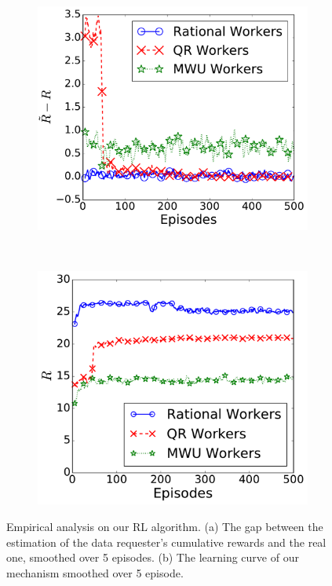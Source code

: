 \begin{figure}[!t]
   \setlength{\abovecaptionskip}{0mm}
    \centering
    \begin{subfigure}[t]{0.24\textwidth}
        \centering
        \includegraphics[width=\textwidth]{image/RIL1}%
		\vspace{-1mm}
        \caption{\label{figure:rewardError}}
    \end{subfigure}%
~
    \begin{subfigure}[t]{0.23\textwidth}
        \centering
        \includegraphics[width=\textwidth]{image/RIL2}%
		\vspace{-1mm}
        \caption{\label{figure:learningCurve}}
    \end{subfigure}
    \caption{\label{figure:learning}Empirical analysis on our RL algorithm. (a) The gap between the estimation of the data requester's cumulative rewards and the real one, smoothed over 5 episodes. (b) The learning curve of our mechanism smoothed over 5 episode.}
	\vspace{-2mm}
\end{figure}
